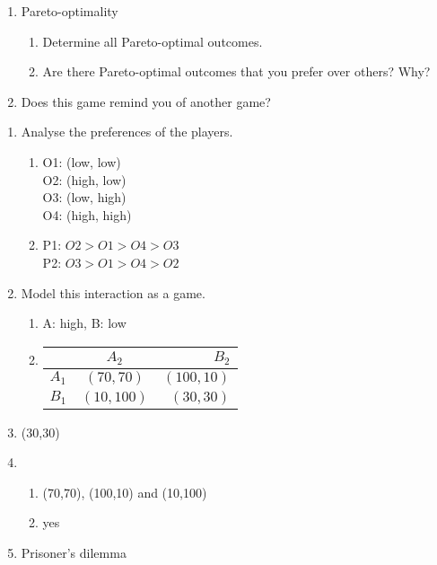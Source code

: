\documentclass[../main.tex]{subfiles}
\begin{document}
\begin{question}
\begin{enumerate}
	\item Pareto-optimality
	\begin{enumerate}
		\item Determine all Pareto-optimal outcomes.
		\item Are there Pareto-optimal outcomes that you prefer over others? Why?
	\end{enumerate}		
		
	\item Does this game remind you of another game?
\end{enumerate}
\end{question}

\begin{solution}
\begin{enumerate}
	\item Analyse the preferences of the players.
	\begin{enumerate}
		\item O1: (low, low)\\
				O2: (high, low)\\
				O3: (low, high)\\
				O4: (high, high)\\
		\item  P1: $O2 > O1 > O4 > O3$ \\
			P2: $O3 > O1 > O4 > O2$
	\end{enumerate}
	\item Model this interaction as a game.
	\begin{enumerate}
		\item A: high, B: low 
		\item	\begin{tabular}{|l|c|r|}
		    	    \hline
		    	    & $A_2$ & $B_2$ \\
		    	    \hline
		    	    $A_1$ & $(70,70)$ & $(100,10)$ \\
		    	    \hline
		    	    $B_1$ & $(10,100)$ & $(30,30)$ \\
		    	    \hline
		    	\end{tabular}
		       
	\end{enumerate}
	
	\item (30,30)
	
	\item 
	\begin{enumerate}
		\item (70,70), (100,10) and (10,100)
		\item yes
	\end{enumerate}		
		
	\item Prisoner's dilemma
\end{enumerate}
\end{solution}
\end{document}
